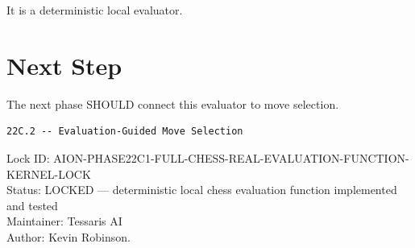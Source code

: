 \documentclass[11pt,a4paper]{article}
\begin{document}
It is a deterministic local evaluator.

\section{Next Step}

The next phase SHOULD connect this evaluator to move selection.

\begin{verbatim}
22C.2 -- Evaluation-Guided Move Selection
\end{verbatim}

\bigskip

\noindent
Lock ID: AION-PHASE22C1-FULL-CHESS-REAL-EVALUATION-FUNCTION-KERNEL-LOCK\\
Status: LOCKED --- deterministic local chess evaluation function implemented and tested\\
Maintainer: Tessaris AI\\
Author: Kevin Robinson.
\end{document}
